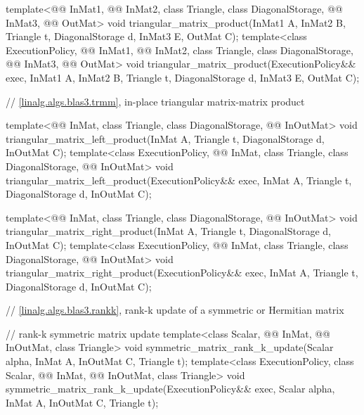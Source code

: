 \begin{codeblock}
{  template<@@ InMat1, @@ InMat2, class Triangle, class DiagonalStorage,
           @@ InMat3, @@ OutMat>
    void triangular_matrix_product(InMat1 A, InMat2 B, Triangle t, DiagonalStorage d, InMat3 E,
                                   OutMat C);
  template<class ExecutionPolicy,
           @@ InMat1, @@ InMat2, class Triangle, class DiagonalStorage,
           @@ InMat3, @@ OutMat>
    void triangular_matrix_product(ExecutionPolicy&& exec,
                                   InMat1 A, InMat2 B, Triangle t, DiagonalStorage d, InMat3 E,
                                   OutMat C);

  // \ref{linalg.algs.blas3.trmm}, in-place triangular matrix-matrix product

  template<@@ InMat, class Triangle, class DiagonalStorage, @@ InOutMat>
    void triangular_matrix_left_product(InMat A, Triangle t, DiagonalStorage d, InOutMat C);
  template<class ExecutionPolicy,
           @@ InMat, class Triangle, class DiagonalStorage, @@ InOutMat>
    void triangular_matrix_left_product(ExecutionPolicy&& exec,
                                        InMat A, Triangle t, DiagonalStorage d, InOutMat C);

  template<@@ InMat, class Triangle, class DiagonalStorage, @@ InOutMat>
    void triangular_matrix_right_product(InMat A, Triangle t, DiagonalStorage d, InOutMat C);
  template<class ExecutionPolicy,
           @@ InMat, class Triangle, class DiagonalStorage, @@ InOutMat>
    void triangular_matrix_right_product(ExecutionPolicy&& exec,
                                         InMat A, Triangle t, DiagonalStorage d, InOutMat C);

  // \ref{linalg.algs.blas3.rankk}, rank-k update of a symmetric or Hermitian matrix

  // rank-k symmetric matrix update
  template<class Scalar, @@ InMat, @@ InOutMat, class Triangle>
    void symmetric_matrix_rank_k_update(Scalar alpha, InMat A, InOutMat C, Triangle t);
  template<class ExecutionPolicy, class Scalar,
           @@ InMat, @@ InOutMat, class Triangle>
    void symmetric_matrix_rank_k_update(ExecutionPolicy&& exec,
                                        Scalar alpha, InMat A, InOutMat C, Triangle t);

}
\end{codeblock}
